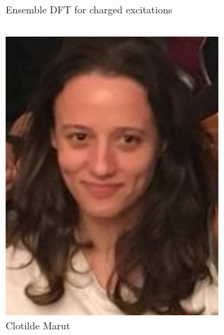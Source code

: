 \documentclass[aspectratio=169,9pt]{beamer}
\begin{document}
\begin{frame}{Ensemble DFT for charged excitations}
\begin{columns}
        \begin{column}{0.25\textwidth}
\centering
\includegraphics[width=0.6\textwidth]{fig/Clotilde}
\\
Clotilde Marut
        \end{column}
        \end{columns}

\end{frame}
\end{document}
